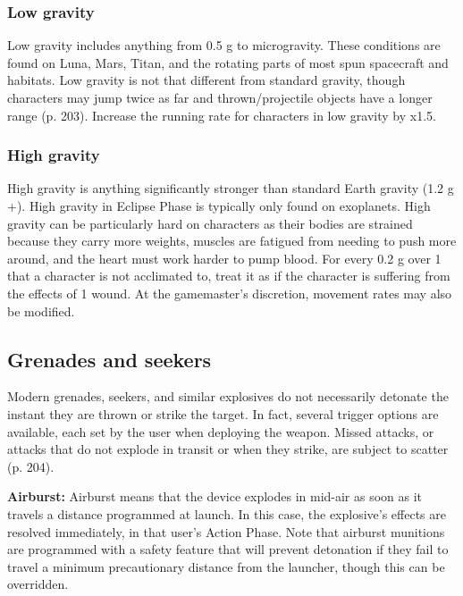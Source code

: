 \subsubsection{Low gravity} 

Low gravity includes anything from 0.5 g to microgravity. These conditions are found on Luna, Mars, Titan, and the rotating parts of most spun spacecraft and habitats. Low gravity is not that different from standard gravity, though characters may jump twice as far and thrown/projectile objects have a longer range (p. 203). Increase the running rate for characters in low gravity by x1.5. 

\subsubsection{High gravity} 

High gravity is anything significantly stronger than standard Earth gravity (1.2 g +). High gravity in Eclipse Phase is typically only found on exoplanets. High gravity can be particularly hard on characters as their bodies are strained because they carry more weights, muscles are fatigued from needing to push more around, and the heart must work harder to pump blood. For every 0.2 g over 1 that a character is not acclimated to, treat it as if the character is suffering from the effects of 1 wound. At the gamemaster’s discretion, movement rates may also be modified. 

\subsection{Grenades and seekers} \label{sec:combat-grenades-seekers} 

Modern grenades, seekers, and similar explosives do not necessarily detonate the instant they are thrown or strike the target. In fact, several trigger options are available, each set by the user when deploying the weapon. Missed attacks, or attacks that do not explode in transit or when they strike, are subject to scatter (p. 204). 

\textbf{Airburst:} Airburst means that the device explodes in mid-air as soon as it travels a distance programmed at launch. In this case, the explosive’s effects are resolved immediately, in that user’s Action Phase. Note that airburst munitions are programmed with a safety feature that will prevent detonation if they fail to travel a minimum precautionary distance from the launcher, though this can be overridden. 

